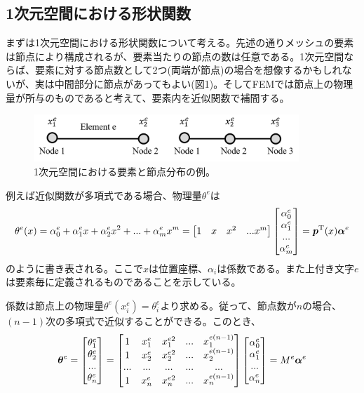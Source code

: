 \documentclass[dvipdfmx, 9pt, a4paper]{jsarticle}
\numberwithin{equation}{section}
\newcommand{\bm}[1]{{\mbox{\boldmath $#1$}}}
\begin{document}
\subsection{1次元空間における形状関数}
まずは1次元空間における形状関数について考える。先述の通りメッシュの要素は節点により構成されるが、要素当たりの節点の数は任意である。1次元空間ならば、要素に対する節点数として2つ(両端が節点)の場合を想像するかもしれないが、実は中間部分に節点があってもよい(図1)。そしてFEMでは節点上の物理量が所与のものであると考えて、要素内を近似関数で補間する。\par
\begin{figure}[b]
\begin{center}
\includegraphics[width = 10cm]{fig1_1.png}
\caption{1次元空間における要素と節点分布の例。}
\end{center}
\end{figure}
例えば近似関数が多項式である場合、物理量$\theta^e$は
\begin{equation}
\theta^e(x)=\alpha^e_0 + \alpha^e_1x + \alpha^e_2 x^2 + ... + \alpha^e_mx^m = 
\begin{bmatrix}
1 & x & x^2 & ... x^m
\end{bmatrix}
\begin{bmatrix}
\alpha^e_0 \\ \alpha^e_1 \\ ... \\ \alpha^e_m
\end{bmatrix}=\bm p^{\rm T}(x)\bm \alpha^e
\end{equation}
のように書き表される。ここで$x$は位置座標、$\alpha_i$は係数である。また上付き文字$e$は要素毎に定義されるものであることを示している。\par
係数は節点上の物理量$\theta^e(x^e_i) = \theta^e_i$より求める。従って、節点数が$n$の場合、$(n-1)$次の多項式で近似することができる。このとき、
\begin{equation}
\bm \theta^e = 
\begin{bmatrix}
\theta^e_1 \\ \theta^e_2 \\ ... \\ \theta^e_n
\end{bmatrix}=
\begin{bmatrix}
1 & x^e_1 & x^{e2}_1 & ... & x^{e(n-1)}_1 \\
1 & x^e_2 & x^{e2}_2 & ... & x^{e(n-1)}_2 \\
... & ... & ... & ... & ... \\
1 & x^e_n & x^{e2}_n & ... & x^{e(n-1)}_n \\
\end{bmatrix}
\begin{bmatrix}
\alpha^e_0 \\ \alpha^e_1 \\ ... \\ \alpha^e_n
\end{bmatrix}
=M^e\bm \alpha^e \notag
\end{equation}
\end{document}
